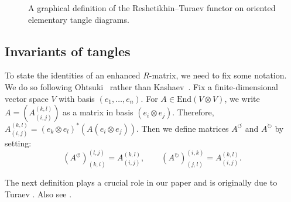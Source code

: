 \documentclass[10pt,a4paper]{amsart}
\makeatletter
\newif\ifv@ht@ \newif\ifv@dp@
\renewcommand*{\phantom} {\v@ht@true \v@dp@true \h@true \ph@nt}
\numberwithin{equation}{section}
\theoremstyle{definition}
\makeatother
\begin{document}
\begin{figure}[htpb!]
\qquad
{}
\qquad
{}
\caption{A graphical definition of the Reshetikhin--Turaev functor on oriented
 elementary tangle diagrams.}\label{fig:FIG3}
\end{figure}

\subsection{Invariants of tangles}
\label{sub:tangles}

To state the identities of an enhanced $R$-matrix, we need to fix some notation.
We do so following Ohtsuki~\cite{Ohtsuki} rather than Kashaev~\cite{GK:multi, Kas1}.
Fix a finite-dimensional vector space $V$ with basis $(e_1, \dots, e_n)$.
For $A \in \mathrm{End}(V \otimes V)$, we write $A = (A_{(i,j)}^{(k,l)})$ as a matrix in
basis $(e_i \otimes e_j)$. Therefore,
$A_{(i,j)}^{(k,l)} = (e_k \otimes e_l)^{\ast}(A(e_i \otimes e_j))$. Then we define
matrices $A^{\circlearrowleft}$ and $A^{\circlearrowright}$ by setting:
\begin{equation}
\label{Ab}
(A^\circlearrowleft)_{(k,i)}^{(l,j)} =A_{(i,j)}^{(k,l)}, \qquad
(A^\circlearrowright)_{(j,l)}^{(i,k)}=A_{(i,j)}^{(k,l)} .
\end{equation}

The next definition plays a crucial role in our paper {and is originally due to Turaev \cite{Turaev88,Turaev89}. Also see \cite[Section~XII.4]{Kassel}}.
\end{document}
